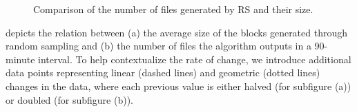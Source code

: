 \begin{figure}[t!]
\centering
{}
\hfill
{}

\caption{Comparison of the number of files generated by \gls{RS} and their size.}
\label{fig:rq1-size-and-number}
\end{figure}


 depicts the relation between (a) the average size of the blocks
generated through random sampling and (b) the number of files the algorithm outputs
in a 90-minute interval.
To help contextualize the rate of change, we introduce additional data
points representing linear (dashed lines) and geometric (dotted lines)
changes in the data, where each previous value is either
halved (for subfigure (a)) or doubled (for subfigure (b)).

